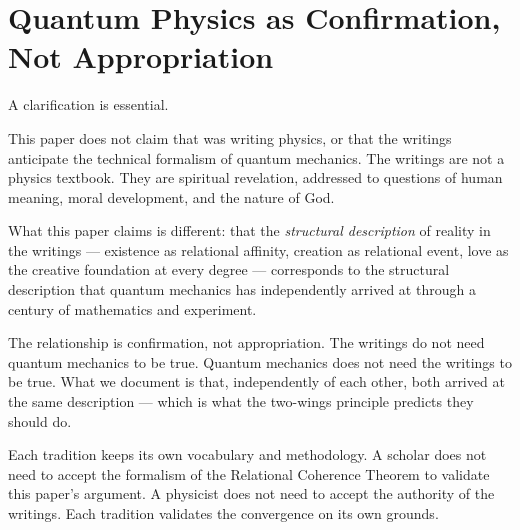 
\section{Quantum Physics as Confirmation, Not Appropriation}
\label{sec:confirmation}


A clarification is essential.

This paper does not claim that \Bahaullah was writing physics, or that the
\bahai writings anticipate the technical formalism of quantum mechanics.
The writings are not a physics textbook.
They are spiritual revelation, addressed to questions of human meaning,
moral development, and the nature of God.

What this paper claims is different: that the \emph{structural description}
of reality in the \bahai writings --- existence as relational affinity, creation
as relational event, love as the creative foundation at every degree --- corresponds
to the structural description that quantum mechanics has independently arrived at
through a century of mathematics and experiment.

The relationship is confirmation, not appropriation.
The \bahai writings do not need quantum mechanics to be true.
Quantum mechanics does not need the \bahai writings to be true.
What we document is that, independently of each other, both arrived at
the same description --- which is what the two-wings principle predicts they should do.

Each tradition keeps its own vocabulary and methodology.
A \bahai scholar does not need to accept the formalism of the Relational Coherence
Theorem to validate this paper's argument.
A physicist does not need to accept the authority of the \bahai writings.
Each tradition validates the convergence on its own grounds.
